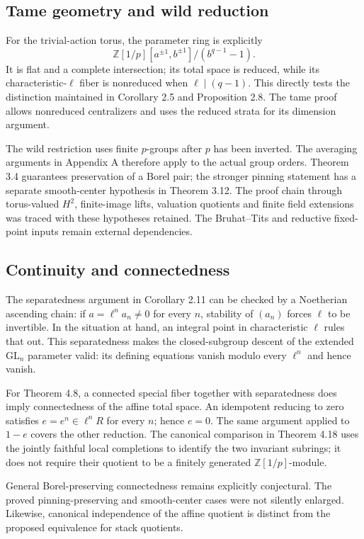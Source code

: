 \documentclass[10pt]{article}
\begin{document}
\subsection*{Tame geometry and wild reduction}
For the trivial-action torus, the parameter ring is explicitly \[\mathbb Z[1/p][a^{\pm1},b^{\pm1}]/(b^{q-1}-1).\] It is flat and a complete intersection; its total space is reduced, while its characteristic-\(\ell\) fiber is nonreduced when \(\ell\mid(q-1)\). This directly tests the distinction maintained in Corollary 2.5 and Proposition 2.8. The tame proof allows nonreduced centralizers and uses the reduced strata for its dimension argument.\par
The wild restriction uses finite \(p\)-groups after \(p\) has been inverted. The averaging arguments in Appendix A therefore apply to the actual group orders. Theorem 3.4 guarantees preservation of a Borel pair; the stronger pinning statement has a separate smooth-center hypothesis in Theorem 3.12. The proof chain through torus-valued \(H^2\), finite-image lifts, valuation quotients and finite field extensions was traced with these hypotheses retained. The Bruhat–Tits and reductive fixed-point inputs remain external dependencies.\par
\subsection*{Continuity and connectedness}
The separatedness argument in Corollary 2.11 can be checked by a Noetherian ascending chain: if \(a=\ell^n a_n\ne0\) for every \(n\), stability of \((a_n)\) forces \(\ell\) to be invertible. In the situation at hand, an integral point in characteristic \(\ell\) rules that out. This separatedness makes the closed-subgroup descent of the extended \(\mathrm{GL}_n\) parameter valid: its defining equations vanish modulo every \(\ell^n\) and hence vanish.\par
For Theorem 4.8, a connected special fiber together with separatedness does imply connectedness of the affine total space. An idempotent reducing to zero satisfies \(e=e^n\in\ell^n R\) for every \(n\); hence \(e=0\). The same argument applied to \(1-e\) covers the other reduction. The canonical comparison in Theorem 4.18 uses the jointly faithful local completions to identify the two invariant subrings; it does not require their quotient to be a finitely generated \(\mathbb Z[1/p]\)-module.\par
General Borel-preserving connectedness remains explicitly conjectural. The proved pinning-preserving and smooth-center cases were not silently enlarged. Likewise, canonical independence of the affine quotient is distinct from the proposed equivalence for stack quotients.\par
\end{document}
